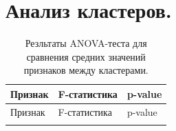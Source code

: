 \documentclass[specification,annotation,times]{itmo-student-thesis}
\begin{document}
\chapter{Анализ кластеров.}\label{sec:app:7:tab-data}

\small
\begin{longtable}{
| >{\centering\arraybackslash}p{5cm}
| >{\centering\arraybackslash}p{3cm}
| >{\centering\arraybackslash}p{3cm}|
}

\caption{Резльтаты ANOVA-теста для сравнения средних значений признаков между кластерами.}
\label{tab:anova_test} \\

\hline
Признак & F-статистика & p-value \\
\hline
\endfirsthead

\hline
Признак & F-статистика & p-value \\
\hline
\endhead

\hline
\endfoot

\hline
\endlastfoot


\end{longtable}
\end{document}
